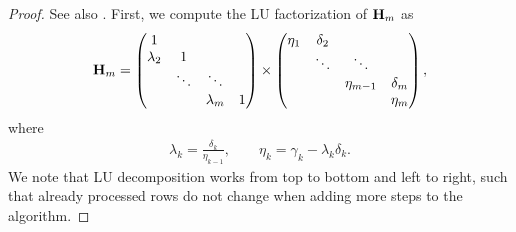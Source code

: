 \begin{proof}
  See also \cite[Section 6.7.1]{Saad00}. First, we compute the LU factorization of $\mathbf H_m$ as
  \begin{gather}
    \mathbf H_m =
    \begin{pmatrix}
      1\\\lambda_2&1\\
      &\ddots&\ddots\\
      &&\lambda_m&1
    \end{pmatrix}
    \times
    \begin{pmatrix}
      \eta_1&\delta_2\\
      &\ddots&\ddots\\
      &&\eta_{m-1}&\delta_m\\
      &&&\eta_m
    \end{pmatrix},
  \end{gather}
  where
  \begin{gather}
    \lambda_k = \frac{\delta_k}{\eta_{k-1}},
    \qquad
    \eta_k = \gamma_k - \lambda_k \delta_k.
  \end{gather}
  We note that LU decomposition works from top to bottom and left to
  right, such that already processed rows do not change when adding
  more steps to the algorithm.


\end{proof}
